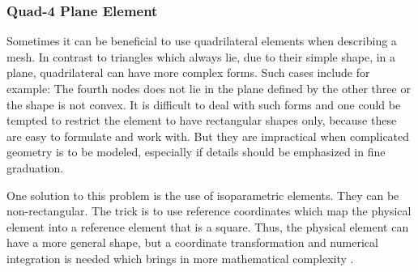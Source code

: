   
  
  \subsubsection{Quad-4 Plane Element}\label{sec:Shell-Plane-Quad}
  Sometimes it can be beneficial to use quadrilateral elements when describing a mesh. In contrast to triangles which always lie, due to their simple shape, in a plane, quadrilateral can have more complex forms. Such cases include for example: The fourth nodes does not lie in the plane defined by the other three or the shape is not convex. It is difficult to deal with such forms and one could be tempted to restrict the element to have rectangular shapes only, because these are easy to formulate and work with. But they are impractical when complicated geometry is to be modeled, especially if details should be emphasized in fine graduation.
    
  One solution to this problem is the use of isoparametric elements. They can be non-rectangular. The trick is to use reference coordinates which map the physical element into a reference element that is a square. Thus, the physical element can have a more general shape, but a coordinate transformation and numerical integration is needed which brings in more mathematical complexity \cite{cook2002concepts}.
  

